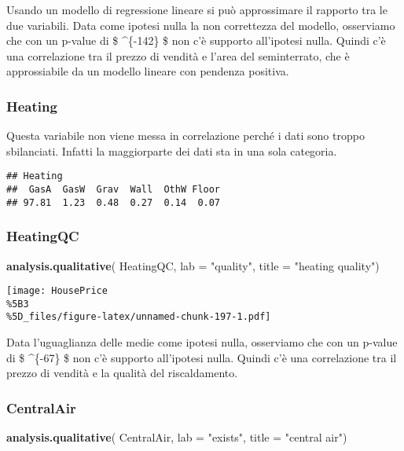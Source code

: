 \documentclass[
]{article}
\newenvironment{Shaded}{\begin{snugshade}}{\end{snugshade}}
\newcommand{\AttributeTok}[1]{\textcolor[rgb]{0.13,0.29,0.53}{#1}}
\newcommand{\FunctionTok}[1]{\textcolor[rgb]{0.13,0.29,0.53}{\textbf{#1}}}
\newcommand{\NormalTok}[1]{#1}
\newcommand{\StringTok}[1]{\textcolor[rgb]{0.31,0.60,0.02}{#1}}
\begin{document}
Usando un modello di regressione lineare si può approssimare il rapporto
tra le due variabili. Data come ipotesi nulla la non correttezza del
modello, osserviamo che con un p-value di \$ \^{}\{-142\} \$
non c'è supporto all'ipotesi nulla. Quindi c'è una correlazione tra il
prezzo di vendità e l'area del seminterrato, che è approssiabile da un
modello lineare con pendenza positiva.

\subsubsection{Heating}\label{heating-1}

Questa variabile non viene messa in correlazione perché i dati sono
troppo sbilanciati. Infatti la maggiorparte dei dati sta in una sola
categoria.

\begin{verbatim}
## Heating
##  GasA  GasW  Grav  Wall  OthW Floor 
## 97.81  1.23  0.48  0.27  0.14  0.07
\end{verbatim}

\subsubsection{HeatingQC}\label{heatingqc-1}

\begin{Shaded}
\begin{Highlighting}[]
\FunctionTok{analysis.qualitative}\NormalTok{(}
\NormalTok{    HeatingQC,}
    \AttributeTok{lab =} \StringTok{"quality"}\NormalTok{,}
    \AttributeTok{title =} \StringTok{"heating quality"}\NormalTok{)}
\end{Highlighting}
\end{Shaded}

\texttt{[image: HousePrice\\\%5B3\\\%5D\_files/figure-latex/unnamed-chunk-197-1.pdf]}

Data l'uguaglianza delle medie come ipotesi nulla, osserviamo che con un
p-value di \$ \^{}\{-67\} \$ non c'è supporto all'ipotesi
nulla. Quindi c'è una correlazione tra il prezzo di vendità e la qualità
del riscaldamento.

\subsubsection{CentralAir}\label{centralair-1}

\begin{Shaded}
\begin{Highlighting}[]
\FunctionTok{analysis.qualitative}\NormalTok{(}
\NormalTok{    CentralAir,}
    \AttributeTok{lab =} \StringTok{"exists"}\NormalTok{,}
    \AttributeTok{title =} \StringTok{"central air"}\NormalTok{)}
\end{Highlighting}
\end{Shaded}
\end{document}
